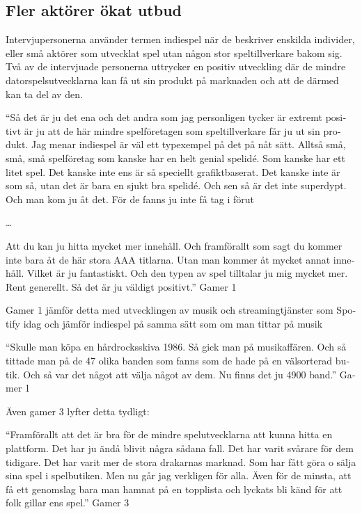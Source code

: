 \documentclass[11p]{article}
\begin{document}
\begin{otherlanguage}{swedish}
    \subsection{Fler aktörer ökat utbud}
    Intervjupersonerna använder termen indiespel när de beskriver enskilda individer, eller små aktörer som utvecklat spel utan någon stor speltillverkare bakom sig. Två av de intervjuade personerna uttrycker en positiv utveckling där de mindre datorspelsutvecklarna kan få ut sin produkt på marknaden och att de därmed kan ta del av den.

    \setlength{\leftskip}{1cm}

    “Så det är ju det ena och det andra som jag personligen tycker är extremt positivt är ju att de här mindre spelföretagen som speltillverkare får ju ut sin produkt.
    Jag menar indiespel är väl ett typexempel på det på nåt sätt.  Alltså små, små, små spelföretag som kanske har en helt genial spelidé. Som kanske har ett litet spel. Det kanske inte ens är så speciellt grafiktbaserat. Det kanske inte är som så, utan det är bara en sjukt bra spelidé. Och sen så är det inte superdypt. Och man kom ju åt det. För de fanns ju inte få tag i förut

    \dots

    Att du kan ju hitta mycket mer innehåll. Och framförallt som sagt du kommer inte bara åt de här stora AAA titlarna. Utan man kommer åt mycket annat innehåll. Vilket är ju fantastiskt. Och den typen av spel tilltalar ju mig mycket mer. Rent generellt. Så det är ju väldigt positivt.” Gamer 1


    \setlength{\leftskip}{0cm}

    Gamer 1 jämför detta med utvecklingen av musik och streamingtjänster som Spotify idag och jämför indiespel  på samma sätt som om man tittar på musik


    \setlength{\leftskip}{1cm}
    “Skulle man köpa en hårdrocksskiva 1986.
    Så gick man på musikaffären. Och så tittade man på de 47 olika banden som fanns som de hade på en välsorterad butik. Och så var det något att välja något av dem. Nu finns det ju 4900 band.” Gamer 1


    \setlength{\leftskip}{0cm}
    Även gamer 3 lyfter detta tydligt:

    \setlength{\leftskip}{1cm}
    “Framförallt att det är bra för de mindre spelutvecklarna att kunna hitta en plattform. Det har ju ändå blivit några sådana fall.
    Det har varit svårare för dem tidigare. Det har varit mer de stora drakarnas marknad. Som har fått göra o sälja sina spel i spelbutiken.
    Men nu går jag verkligen för alla. Även för de minsta, att få ett genomslag  bara man hamnat på en topplista och lyckats bli känd för att folk gillar ens spel.” Gamer 3



\end{otherlanguage}
\end{document}
